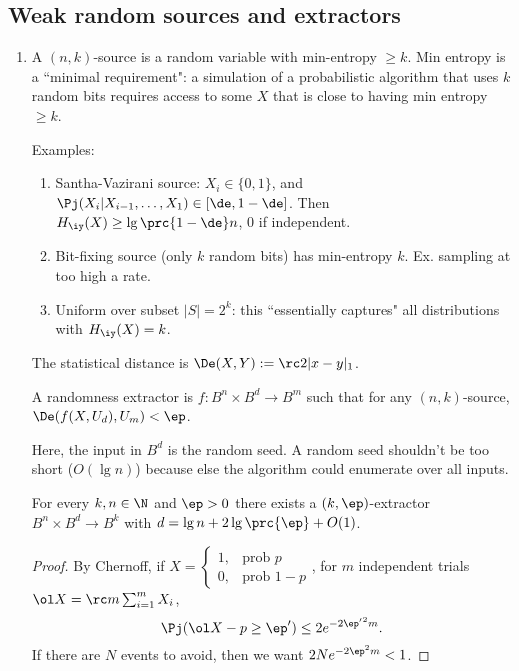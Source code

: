 \subsection{Weak random sources and extractors}
\begin{enumerate}
\item
A $(n,k)$-source is a random variable with min-entropy $\ge k$.  Min entropy is a ``minimal requirement": a simulation of a probabilistic algorithm that uses $k$ random bits requires access to some $X$ that is close to having min entropy $\ge k$.

Examples:
\begin{enumerate}
\item
Santha-Vazirani source: $X_i\in \{0,1\}$, and $\Pj(X_i|X_{i-1},\ldots, X_1)\in [\de,1-\de]$. Then $H_{\iy}(X)\ge \lg \prc{1-\de}n$, 0 if independent.
\item
Bit-fixing source (only $k$ random bits) has min-entropy $k$. Ex. sampling at too high a rate.
\item
Uniform over subset $|S|=2^k$: this ``essentially captures" all distributions with $H_{\iy}(X)=k$.
\end{enumerate}
The statistical distance is $\De(X,Y):=\rc 2 |x-y|_1$.

\begin{df}
A randomness extractor is $f:B^n\times B^d\to B^m$ such that for any $(n,k)$-source, $\De(f(X,U_d),U_m) <\ep$.
\end{df}
Here,
the input in $B^d$ is the random seed. A random seed shouldn't be too short ($O(\lg n)$) because else the algorithm could enumerate over all inputs.
\begin{lem}
For every $k,n\in \N$ and $\ep>0$ there exists a $(k,\ep)$-extractor $B^n\times B^d\to B^k$ with $d=\lg n+2\lg\prc{\ep}+O(1)$.
\end{lem}
\begin{proof}
By Chernoff, if $X=\begin{cases}1,&\text{prob }p\\0,&\text{prob }1-p\end{cases}$, for $m$ independent trials $\ol X=\rc m\sum_{i=1}^m X_i$,
\[
\Pj(\ol X-p\ge \ep')\le 2e^{-2{\ep'}^2m}.
\]
If there are $N$ events to avoid, then we want $2Ne^{-2\ep^2m}<1$.


\end{proof}
\end{enumerate}
